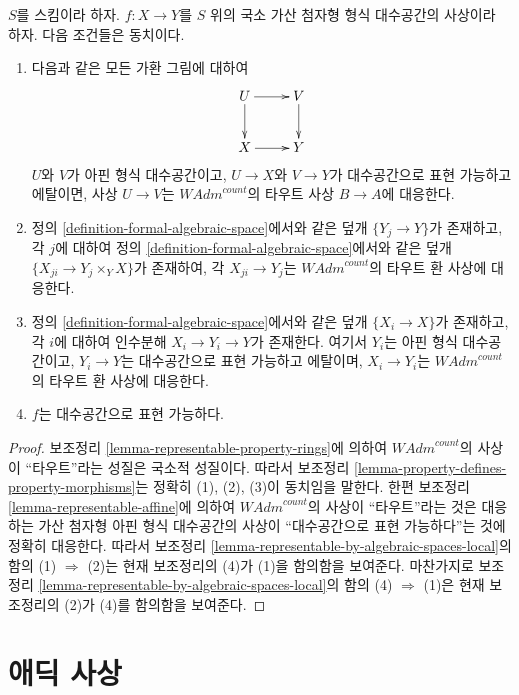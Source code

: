 \begin{lemma}
\label{lemma-representable-local-property}
$S$를 스킴이라 하자. $f : X \to Y$를 $S$ 위의 국소 가산 첨자형
형식 대수공간의 사상이라 하자. 다음 조건들은 동치이다.
\begin{enumerate}
\item 다음과 같은 모든 가환 그림에 대하여
$$
\xymatrix{
U \ar[d] \ar[r] & V \ar[d] \\
X \ar[r] & Y
}
$$
$U$와 $V$가 아핀 형식 대수공간이고, $U \to X$와 $V \to Y$가
대수공간으로 표현 가능하고 에탈이면, 사상 $U \to V$는
$\textit{WAdm}^{count}$의 타우트 사상 $B \to A$에 대응한다.
\item 정의 \ref{definition-formal-algebraic-space}에서와 같은 덮개
$\{Y_j \to Y\}$가 존재하고, 각 $j$에 대하여 정의
\ref{definition-formal-algebraic-space}에서와 같은 덮개
$\{X_{ji} \to Y_j \times_Y X\}$가 존재하여, 각
$X_{ji} \to Y_j$는 $\textit{WAdm}^{count}$의 타우트 환 사상에
대응한다.
\item 정의 \ref{definition-formal-algebraic-space}에서와 같은 덮개
$\{X_i \to X\}$가 존재하고, 각 $i$에 대하여 인수분해
$X_i \to Y_i \to Y$가 존재한다. 여기서 $Y_i$는 아핀 형식
대수공간이고, $Y_i \to Y$는 대수공간으로 표현 가능하고 에탈이며,
$X_i \to Y_i$는 $\textit{WAdm}^{count}$의 타우트 환 사상에
대응한다.
\item $f$는 대수공간으로 표현 가능하다.
\end{enumerate}
\end{lemma}

\begin{proof}
보조정리 \ref{lemma-representable-property-rings}에 의하여
$\textit{WAdm}^{count}$의 사상이 ``타우트''라는 성질은 국소적
성질이다. 따라서 보조정리
\ref{lemma-property-defines-property-morphisms}는 정확히 (1), (2),
(3)이 동치임을 말한다. 한편 보조정리
\ref{lemma-representable-affine}에 의하여
$\textit{WAdm}^{count}$의 사상이 ``타우트''라는 것은 대응하는
가산 첨자형 아핀 형식 대수공간의 사상이 ``대수공간으로 표현
가능하다''는 것에 정확히 대응한다. 따라서 보조정리
\ref{lemma-representable-by-algebraic-spaces-local}의 함의
(1) $\Rightarrow$ (2)는 현재 보조정리의 (4)가 (1)을 함의함을
보여준다. %
마찬가지로 보조정리
\ref{lemma-representable-by-algebraic-spaces-local}의 함의
(4) $\Rightarrow$ (1)은 현재 보조정리의 (2)가 (4)를 함의함을
보여준다.
\end{proof}

\section{애딕 사상}
\label{section-adic}

